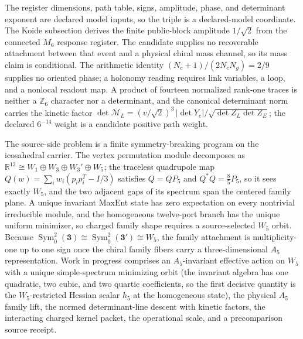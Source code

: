 \documentclass[11pt]{article}
\begin{document}
The register dimensions, path table, signs, amplitude, phase, and determinant
exponent are declared model inputs, so the triple is a declared-model
coordinate. The Koide subsection derives the finite
public-block amplitude \(1/\sqrt2\) from the connected \(M_6\) response register.
The candidate supplies no recoverable attachment between that event and a physical chiral mass
channel, so its mass claim is conditional. The arithmetic identity
\((N_c+1)/(2N_cN_g)=2/9\) supplies no oriented phase; a holonomy
reading requires link variables, a loop, and a nonlocal readout map.
A product of fourteen normalized rank-one traces is neither a
\(\mathbb Z_6\) character nor a determinant, and the canonical determinant
norm carries the kinetic factor
\(\det\mathcal M_L=(v/\sqrt2)^3\,|\det Y_e|/\sqrt{\det Z_L\det Z_E}\); the
declared \(6^{-14}\) weight is a candidate positive path weight.

The source-side problem is a finite
symmetry-breaking program on the icosahedral carrier.  The vertex permutation
module decomposes as
\(\mathbb R^{12}\cong W_1\oplus W_3\oplus W_3'\oplus W_5\); the traceless
quadrupole map \(Q(w)=\sum_iw_i(p_ip_i^T-I/3)\) satisfies \(Q=QP_5\) and
\(Q^*Q=\frac85P_5\), so it sees exactly \(W_5\), and the two adjacent gaps of
its spectrum span the centered family plane.  A unique invariant MaxEnt state
has zero expectation on every nontrivial irreducible module, and the
homogeneous twelve-port branch has the unique uniform minimizer, so charged
family shape requires a source-selected \(W_5\) orbit.  Because
\(\operatorname{Sym}^2_0(\mathbf3)\cong\operatorname{Sym}^2_0(\mathbf3')\cong W_5\),
the family attachment is multiplicity-one up to one sign once the chiral
family fibers carry a three-dimensional \(A_5\) representation.  Work in
progress comprises an \(A_5\)-invariant effective action on \(W_5\) with a unique
simple-spectrum minimizing orbit (the invariant algebra has one quadratic,
two cubic, and two quartic coefficients, so the first decisive quantity is
the \(W_5\)-restricted Hessian scalar \(h_5\) at the homogeneous state), the
physical \(A_5\) family lift, the normed determinant-line descent with
kinetic factors, the interacting charged kernel packet, the operational
scale, and a precomparison source receipt.
\end{document}
